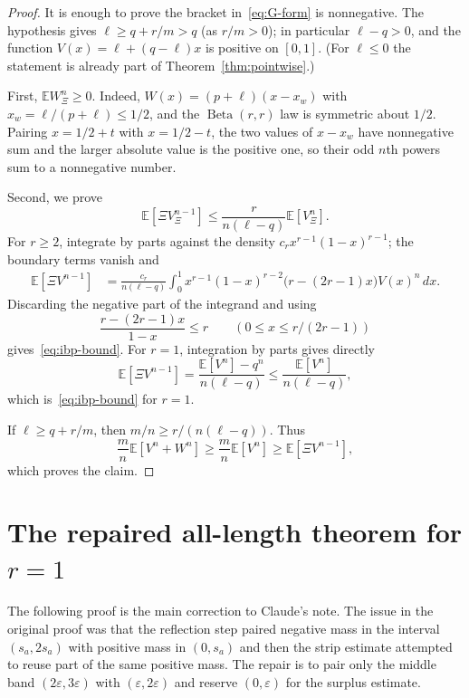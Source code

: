 \documentclass[11pt]{article}
\newcommand{\E}{\mathbb E}
\newcommand{\Betad}{\operatorname{Beta}}
\begin{document}
\begin{proof}
It is enough to prove the bracket in~\eqref{eq:G-form} is nonnegative.  The hypothesis gives $\ell\ge q+r/m>q$ (as $r/m>0$); in particular $\ell-q>0$, and the function $V(x)=\ell+(q-\ell)x$ is positive on $[0,1]$.  (For $\ell\le0$ the statement is already part of Theorem~\ref{thm:pointwise}.)

First, $\E W_\Xi^n\ge0$.  Indeed, $W(x)=(p+\ell)(x-x_w)$ with $x_w=\ell/(p+\ell)\le1/2$, and the $\Betad(r,r)$ law is symmetric about $1/2$.  Pairing $x=1/2+t$ with $x=1/2-t$, the two values of $x-x_w$ have nonnegative sum and the larger absolute value is the positive one, so their odd $n$th powers sum to a nonnegative number.

Second, we prove
\begin{equation}\label{eq:ibp-bound}
        \E[\Xi V_\Xi^{n-1}]
        \le \frac{r}{n(\ell-q)}\E[V_\Xi^n].
\end{equation}
For $r\ge2$, integrate by parts against the density $c_rx^{r-1}(1-x)^{r-1}$; the boundary terms vanish and
\[
\begin{aligned}
        \E[\Xi V^{n-1}]
        &=\frac{c_r}{n(\ell-q)}
        \int_0^1x^{r-1}(1-x)^{r-2}\bigl(r-(2r-1)x\bigr)V(x)^n\,dx.
\end{aligned}
\]
Discarding the negative part of the integrand and using
\[
        \frac{r-(2r-1)x}{1-x}\le r
        \qquad (0\le x\le r/(2r-1))
\]
gives~\eqref{eq:ibp-bound}.  For $r=1$, integration by parts gives directly
\[
        \E[\Xi V^{n-1}]=\frac{\E[V^n]-q^n}{n(\ell-q)}
        \le\frac{\E[V^n]}{n(\ell-q)},
\]
which is~\eqref{eq:ibp-bound} for $r=1$.

If $\ell\ge q+r/m$, then $m/n\ge r/(n(\ell-q))$.  Thus
\[
        \frac mn\E[V^n+W^n]
        \ge\frac mn\E[V^n]
        \ge\E[\Xi V^{n-1}],
\]
which proves the claim.
\end{proof}

\section{The repaired all-length theorem for $r=1$}\label{sec:r1}

The following proof is the main correction to Claude's note.  The issue in the original proof was that the reflection step paired negative mass in the interval $(s_a,2s_a)$ with positive mass in $(0,s_a)$ and then the strip estimate attempted to reuse part of the same positive mass.  The repair is to pair only the middle band $(2\varepsilon,3\varepsilon)$ with $(\varepsilon,2\varepsilon)$ and reserve $(0,\varepsilon)$ for the surplus estimate.
\end{document}
